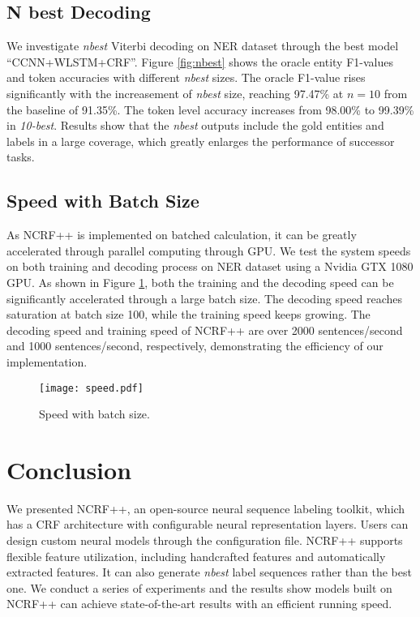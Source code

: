 \documentclass[11pt,a4paper]{article}
\begin{document}
\subsection{N best Decoding}
We investigate \textit{nbest} Viterbi decoding on NER dataset through the best model ``CCNN+WLSTM+CRF''. Figure \ref{fig:nbest} shows the oracle entity F1-values and token accuracies with different \textit{nbest} sizes. The oracle F1-value rises significantly with the increasement of \textit{nbest} size, reaching 97.47\% at $n=10$ from the baseline of 91.35\%. The token level accuracy increases from 98.00\% to 99.39\% in \textit{10-best}. Results show that the \textit{nbest} outputs include the gold entities and labels in a large coverage, which greatly enlarges the performance of successor tasks.



\subsection{Speed with Batch Size}
As NCRF++ is implemented on batched calculation, it can be greatly accelerated through parallel computing through GPU. We test the system speeds on both training and decoding process on NER dataset using a Nvidia GTX 1080 GPU. As shown in Figure \ref{fig:speed}, both the training and the decoding speed can be significantly accelerated through a large batch size. The decoding speed reaches saturation at batch size 100, while the training speed keeps growing. The decoding speed and training speed of NCRF++ are over 2000 sentences/second and 1000 sentences/second, respectively, demonstrating the efficiency of our implementation.

\begin{figure}[!t]
  \centering 
    \texttt{[image: speed.pdf]}
  \caption{Speed with batch size.} 
  \label{fig:speed} \end{figure}



\section{Conclusion}
We presented NCRF++, an open-source neural sequence labeling toolkit, which has a CRF architecture with configurable neural representation layers. Users can design custom neural models through the configuration file. NCRF++ supports flexible feature utilization, including handcrafted features and automatically extracted features. It can also generate \textit{nbest} label sequences rather than the best one. We conduct a series of experiments and the results show models built on NCRF++ can achieve state-of-the-art results with an efficient running speed. 





\newpage


\end{document}
